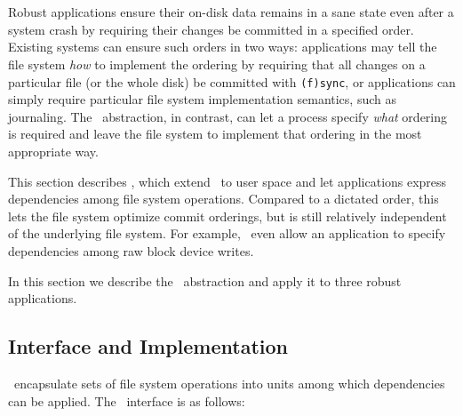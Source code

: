 \section{\Patchgroups}
\label{sec:patchgroup}

\newcommand{\pgCreate}{\texttt{pg\_create}}
\newcommand{\pgDepend}{\texttt{pg\_depend}}
\newcommand{\pgEngage}{\texttt{pg\_engage}}
\newcommand{\pgDisengage}{\texttt{pg\_disengage}}
\newcommand{\pgRelease}{\texttt{pg\_release}}
\newcommand{\pgSync}{\texttt{pg\_sync}}
\newcommand{\pgClose}{\texttt{pg\_close}}

Robust applications
%
ensure their on-disk data remains in a sane state even after a
system crash by requiring their changes be committed in
a specified order.
%
Existing systems can ensure such orders in two ways:
%
applications may tell the file system \emph{how} to implement the ordering
by requiring that all changes on a particular file (or the whole disk) be
committed with \texttt{(f)sync}, or applications can simply require
particular file system implementation semantics, such as journaling.
%
%
The \patch\ abstraction, in contrast, can let a process specify
\emph{what} ordering is required and leave the file system to implement
that ordering in the most appropriate way.


This section describes \emph{\patchgroups}, which extend \patches\ to user
space and let applications express dependencies among file system
operations.
%
Compared to a dictated order, this lets the file system optimize commit
orderings, but is still relatively independent of the underlying file
system.
%
For example, \patchgroups\ even allow an application to specify
dependencies among raw block device writes.

In this section we describe the \patchgroup\ abstraction
%
and apply it to three robust applications.


\subsection{Interface and Implementation}
\label{sec:patchgroup:interface}

\Patchgroups\ encapsulate sets of file system operations into units among
which dependencies can be applied.
%
%
The \patchgroup\ interface is as follows:

